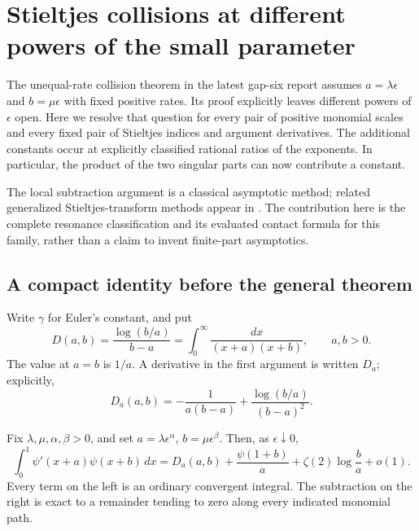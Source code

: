 \section{Stieltjes collisions at different powers of the small parameter}
\label{mc:section}

The unequal-rate collision theorem in the latest gap-six report
\cite[Section~4 and research question~10]{GapSix} assumes
$a=\lambda\epsilon$ and $b=\mu\epsilon$ with fixed positive rates.
Its proof explicitly leaves different powers of $\epsilon$ open.
Here we resolve that question for every pair of positive monomial
scales and every fixed pair of Stieltjes indices and argument
derivatives. The additional constants occur at explicitly classified
rational ratios of the exponents. In particular, the product of the
two singular parts can now contribute a constant.

The local subtraction argument is a classical asymptotic method;
related generalized Stieltjes-transform methods appear in
\cite{TicaGalapon}. The contribution here is the complete resonance
classification and its evaluated contact formula for this family,
rather than a claim to invent finite-part asymptotics.

\subsection{A compact identity before the general theorem}

Write $\gamma$ for Euler's constant, and put
\begin{equation}\label{mc:D}
 D(a,b)=\frac{\log(b/a)}{b-a}
       =\int_0^\infty\frac{dx}{(x+a)(x+b)},\qquad a,b>0.
\end{equation}
The value at $a=b$ is $1/a$. A derivative in the first argument is
written $D_a$; explicitly,
\begin{equation}\label{mc:Da}
 D_a(a,b)=-\frac1{a(b-a)}+
                    \frac{\log(b/a)}{(b-a)^2}.
\end{equation}

\begin{theorem}\label{mc:ordered-limit}
Fix $\lambda,\mu,\alpha,\beta>0$, and set
$a=\lambda\epsilon^\alpha$, $b=\mu\epsilon^\beta$.
Then, as $\epsilon\downarrow0$,
\begin{equation}\label{mc:ordered-uniform}
 \boxed{\displaystyle
 \int_0^1\psi'(x+a)\psi(x+b)\,dx
 =D_a(a,b)+\frac{\psi(1+b)}a
                   +\zeta(2)\log\frac ba+o(1).}
\end{equation}
Every term on the left is an ordinary convergent integral. The
subtraction on the right is exact to a remainder tending to zero
along every indicated monomial path.
\end{theorem}

